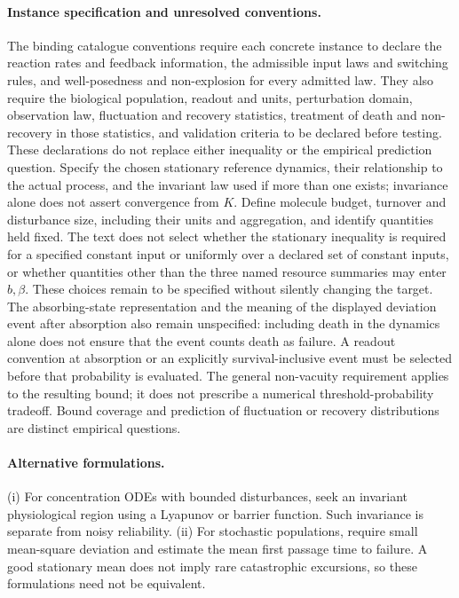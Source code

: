\documentclass[11pt]{article}
\begin{document}
\paragraph{Instance specification and unresolved conventions.} The binding catalogue conventions require each concrete instance to declare the reaction rates and feedback information, the admissible input laws and switching rules, and well-posedness and non-explosion for every admitted law. They also require the biological population, readout and units, perturbation domain, observation law, fluctuation and recovery statistics, treatment of death and non-recovery in those statistics, and validation criteria to be declared before testing. These declarations do not replace either inequality or the empirical prediction question. Specify the chosen stationary reference dynamics, their relationship to the actual process, and the invariant law used if more than one exists; invariance alone does not assert convergence from $K$. Define molecule budget, turnover and disturbance size, including their units and aggregation, and identify quantities held fixed. The text does not select whether the stationary inequality is required for a specified constant input or uniformly over a declared set of constant inputs, or whether quantities other than the three named resource summaries may enter $b,\beta$. These choices remain to be specified without silently changing the target. The absorbing-state representation and the meaning of the displayed deviation event after absorption also remain unspecified: including death in the dynamics alone does not ensure that the event counts death as failure. A readout convention at absorption or an explicitly survival-inclusive event must be selected before that probability is evaluated. The general non-vacuity requirement applies to the resulting bound; it does not prescribe a numerical threshold-probability tradeoff. Bound coverage and prediction of fluctuation or recovery distributions are distinct empirical questions.

\paragraph{Alternative formulations.} (i) For concentration ODEs with bounded disturbances, seek an invariant physiological region using a Lyapunov or barrier function. Such invariance is separate from noisy reliability. (ii) For stochastic populations, require small mean-square deviation and estimate the mean first passage time to failure. A good stationary mean does not imply rare catastrophic excursions, so these formulations need not be equivalent.
\end{document}
